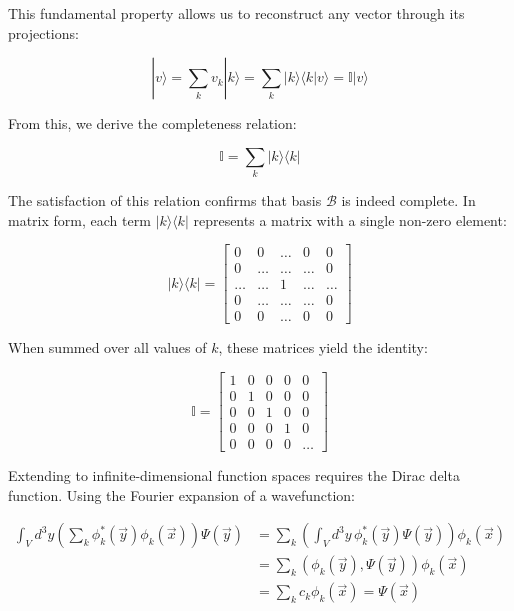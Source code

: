 This fundamental property allows us to reconstruct any vector through its projections:

\begin{equation}
|v\rangle = \sum_k v_k|k\rangle = \sum_k |k\rangle\langle k|v\rangle = \mathbb{I}|v\rangle
\end{equation}

From this, we derive the completeness relation:

\begin{equation}
\mathbb{I} = \sum_k |k\rangle\langle k|
\end{equation}

The satisfaction of this relation confirms that basis $\mathcal{B}$ is indeed complete. In matrix form, each term $|k\rangle\langle k|$ represents a matrix with a single non-zero element:

\[
|k\rangle\langle k| = \begin{bmatrix}
0 & 0 & \ldots & 0 & 0 \\
0 & \ldots & \ldots & \ldots & 0 \\
\ldots & \ldots & 1 & \ldots & \ldots \\
0 & \ldots & \ldots & \ldots & 0 \\
0 & 0 & \ldots & 0 & 0
\end{bmatrix}
\]

When summed over all values of $k$, these matrices yield the identity:

\[
\mathbb{I} = \begin{bmatrix}
1 & 0 & 0 & 0 & 0 \\
0 & 1 & 0 & 0 & 0 \\
0 & 0 & 1 & 0 & 0 \\
0 & 0 & 0 & 1 & 0 \\
0 & 0 & 0 & 0 & \ldots
\end{bmatrix}
\]

Extending to infinite-dimensional function spaces requires the Dirac delta function. Using the Fourier expansion of a wavefunction:

\begin{align}
\int_V d^3y \left(\sum_k \phi_k^*(\vec{y})\phi_k(\vec{x})\right)\Psi(\vec{y}) &= \sum_k \left(\int_V d^3y\, \phi_k^*(\vec{y})\Psi(\vec{y})\right)\phi_k(\vec{x}) \\
&= \sum_k (\phi_k(\vec{y}), \Psi(\vec{y}))\phi_k(\vec{x}) \\
&= \sum_k c_k\phi_k(\vec{x}) = \Psi(\vec{x})
\end{align}

